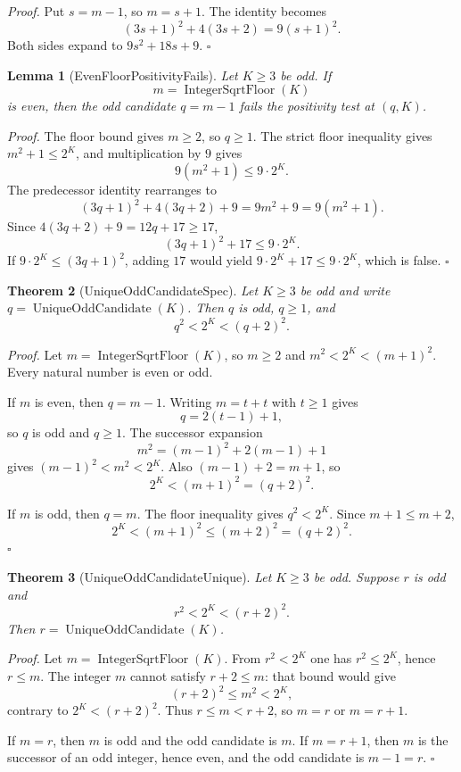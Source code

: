 \documentclass[11pt,letterpaper]{article}
\newtheorem{theorem}{Theorem}
\newtheorem{lemma}[theorem]{Lemma}
\newenvironment{proof}{\noindent\textit{Proof.}}{\hfill\(\square\)}
\begin{document}
\begin{proof}
Put \(s=m-1\), so \(m=s+1\). The identity becomes
\[
(3s+1)^2+4(3s+2)=9(s+1)^2.
\]
Both sides expand to \(9s^2+18s+9\).
\end{proof}

\begin{lemma}[EvenFloorPositivityFails]
Let \(K\ge 3\) be odd. If
\[
m=\operatorname{IntegerSqrtFloor}(K)
\]
is even, then the odd candidate \(q=m-1\) fails the positivity test at
\((q,K)\).
\end{lemma}

\begin{proof}
The floor bound gives \(m\ge 2\), so \(q\ge 1\). The strict floor inequality
gives \(m^2+1\le 2^K\), and multiplication by \(9\) gives
\[
9(m^2+1)\le 9\cdot 2^K.
\]
The predecessor identity rearranges to
\[
(3q+1)^2+4(3q+2)+9=9m^2+9=9(m^2+1).
\]
Since \(4(3q+2)+9=12q+17\ge 17\),
\[
(3q+1)^2+17\le 9\cdot 2^K.
\]
If \(9\cdot 2^K\le(3q+1)^2\), adding \(17\) would yield
\(9\cdot 2^K+17\le 9\cdot 2^K\), which is false.
\end{proof}

\begin{theorem}[UniqueOddCandidateSpec]
Let \(K\ge 3\) be odd and write \(q=\operatorname{UniqueOddCandidate}(K)\).
Then \(q\) is odd, \(q\ge 1\), and
\[
q^2<2^K<(q+2)^2.
\]
\end{theorem}

\begin{proof}
Let \(m=\operatorname{IntegerSqrtFloor}(K)\), so \(m\ge 2\) and
\(m^2<2^K<(m+1)^2\). Every natural number is even or odd.

If \(m\) is even, then \(q=m-1\). Writing \(m=t+t\) with \(t\ge 1\) gives
\[
q=2(t-1)+1,
\]
so \(q\) is odd and \(q\ge 1\). The successor expansion
\[
m^2=(m-1)^2+2(m-1)+1
\]
gives \((m-1)^2<m^2<2^K\). Also \((m-1)+2=m+1\), so
\[
2^K<(m+1)^2=(q+2)^2.
\]

If \(m\) is odd, then \(q=m\). The floor inequality gives \(q^2<2^K\). Since
\(m+1\le m+2\),
\[
2^K<(m+1)^2\le(m+2)^2=(q+2)^2.
\]
\end{proof}

\begin{theorem}[UniqueOddCandidateUnique]
Let \(K\ge 3\) be odd. Suppose \(r\) is odd and
\[
r^2<2^K<(r+2)^2.
\]
Then \(r=\operatorname{UniqueOddCandidate}(K)\).
\end{theorem}

\begin{proof}
Let \(m=\operatorname{IntegerSqrtFloor}(K)\). From \(r^2<2^K\) one has
\(r^2\le 2^K\), hence \(r\le m\). The integer \(m\) cannot satisfy
\(r+2\le m\): that bound would give
\[
(r+2)^2\le m^2<2^K,
\]
contrary to \(2^K<(r+2)^2\). Thus \(r\le m<r+2\), so \(m=r\) or \(m=r+1\).

If \(m=r\), then \(m\) is odd and the odd candidate is \(m\). If \(m=r+1\),
then \(m\) is the successor of an odd integer, hence even, and the odd
candidate is \(m-1=r\).
\end{proof}
\end{document}
